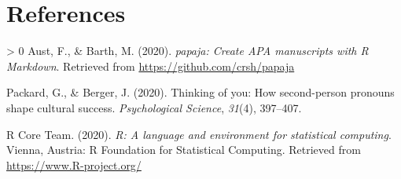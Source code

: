 \documentclass[
  english,
  man]{apa6}
\newlength{\cslhangindent}
\newenvironment{CSLReferences}[3] %
 {%
  \setlength{\parindent}{0pt}
  \ifodd #1 \everypar{\setlength{\hangindent}{\cslhangindent}}\ignorespaces\fi
  \ifnum #2 > 0
  \setlength{\parskip}{#2\baselineskip}
  \fi
 }%
 {}
\begin{document}
\newpage

\hypertarget{references}{%
\section{References}\label{references}}

\begingroup
\setlength{\parindent}{-0.5in}
\setlength{\leftskip}{0.5in}

\hypertarget{refs}{}
\begin{CSLReferences}{1}{0}
\leavevmode\hypertarget{ref-R-papaja}{}%
Aust, F., \& Barth, M. (2020). \emph{{papaja}: {Create} {APA} manuscripts with {R Markdown}}. Retrieved from \url{https://github.com/crsh/papaja}

\leavevmode\hypertarget{ref-PackardBergerYou}{}%
Packard, G., \& Berger, J. (2020). Thinking of you: How second-person pronouns shape cultural success. \emph{Psychological Science}, \emph{31}(4), 397--407.

\leavevmode\hypertarget{ref-R-base}{}%
R Core Team. (2020). \emph{R: A language and environment for statistical computing}. Vienna, Austria: R Foundation for Statistical Computing. Retrieved from \url{https://www.R-project.org/}

\end{CSLReferences}

\endgroup
\end{document}
